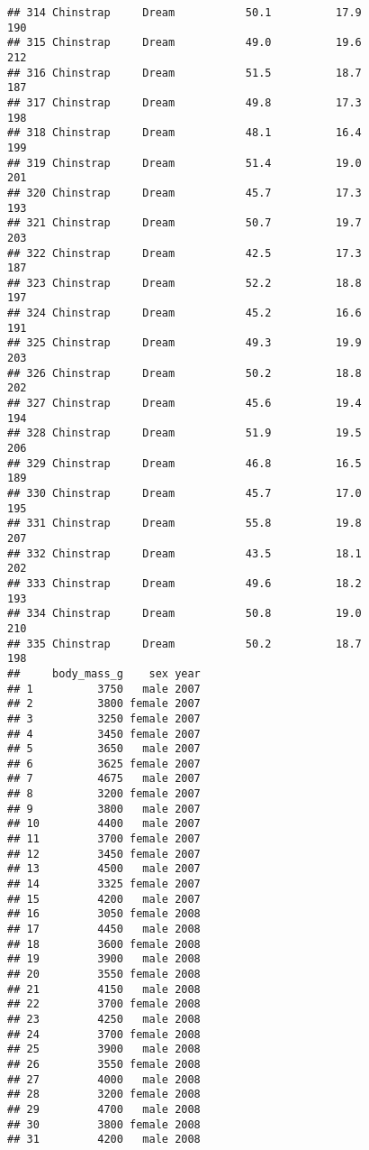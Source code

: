 \documentclass[
]{article}
\begin{document}
\begin{verbatim}
## 314 Chinstrap     Dream           50.1          17.9               190
## 315 Chinstrap     Dream           49.0          19.6               212
## 316 Chinstrap     Dream           51.5          18.7               187
## 317 Chinstrap     Dream           49.8          17.3               198
## 318 Chinstrap     Dream           48.1          16.4               199
## 319 Chinstrap     Dream           51.4          19.0               201
## 320 Chinstrap     Dream           45.7          17.3               193
## 321 Chinstrap     Dream           50.7          19.7               203
## 322 Chinstrap     Dream           42.5          17.3               187
## 323 Chinstrap     Dream           52.2          18.8               197
## 324 Chinstrap     Dream           45.2          16.6               191
## 325 Chinstrap     Dream           49.3          19.9               203
## 326 Chinstrap     Dream           50.2          18.8               202
## 327 Chinstrap     Dream           45.6          19.4               194
## 328 Chinstrap     Dream           51.9          19.5               206
## 329 Chinstrap     Dream           46.8          16.5               189
## 330 Chinstrap     Dream           45.7          17.0               195
## 331 Chinstrap     Dream           55.8          19.8               207
## 332 Chinstrap     Dream           43.5          18.1               202
## 333 Chinstrap     Dream           49.6          18.2               193
## 334 Chinstrap     Dream           50.8          19.0               210
## 335 Chinstrap     Dream           50.2          18.7               198
##     body_mass_g    sex year
## 1          3750   male 2007
## 2          3800 female 2007
## 3          3250 female 2007
## 4          3450 female 2007
## 5          3650   male 2007
## 6          3625 female 2007
## 7          4675   male 2007
## 8          3200 female 2007
## 9          3800   male 2007
## 10         4400   male 2007
## 11         3700 female 2007
## 12         3450 female 2007
## 13         4500   male 2007
## 14         3325 female 2007
## 15         4200   male 2007
## 16         3050 female 2008
## 17         4450   male 2008
## 18         3600 female 2008
## 19         3900   male 2008
## 20         3550 female 2008
## 21         4150   male 2008
## 22         3700 female 2008
## 23         4250   male 2008
## 24         3700 female 2008
## 25         3900   male 2008
## 26         3550 female 2008
## 27         4000   male 2008
## 28         3200 female 2008
## 29         4700   male 2008
## 30         3800 female 2008
## 31         4200   male 2008

\end{verbatim}
\end{document}
